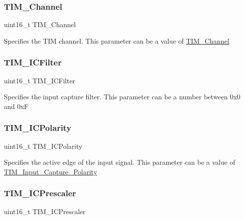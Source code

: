 \subsubsection{\texorpdfstring{TIM\_Channel}{TIM\_Channel}}
{\footnotesize\ttfamily uint16\+\_\+t T\+I\+M\+\_\+\+Channel}

Specifies the T\+IM channel. This parameter can be a value of \mbox{\hyperlink{group___t_i_m___channel}{T\+I\+M\+\_\+\+Channel}} \mbox{\label{struct_t_i_m___i_c_init_type_def_a751574b5d1f66bea6c3405d2975e420a}} 
\subsubsection{\texorpdfstring{TIM\_ICFilter}{TIM\_ICFilter}}
{\footnotesize\ttfamily uint16\+\_\+t T\+I\+M\+\_\+\+I\+C\+Filter}

Specifies the input capture filter. This parameter can be a number between 0x0 and 0xF \mbox{\label{struct_t_i_m___i_c_init_type_def_a71dc0cc2f4eb59451ea323719b0741bb}} 
\subsubsection{\texorpdfstring{TIM\_ICPolarity}{TIM\_ICPolarity}}
{\footnotesize\ttfamily uint16\+\_\+t T\+I\+M\+\_\+\+I\+C\+Polarity}

Specifies the active edge of the input signal. This parameter can be a value of \mbox{\hyperlink{group___t_i_m___input___capture___polarity}{T\+I\+M\+\_\+\+Input\+\_\+\+Capture\+\_\+\+Polarity}} \mbox{\label{struct_t_i_m___i_c_init_type_def_abdff50beb0809a640ccf2cebde439a00}} 
\subsubsection{\texorpdfstring{TIM\_ICPrescaler}{TIM\_ICPrescaler}}
{\footnotesize\ttfamily uint16\+\_\+t T\+I\+M\+\_\+\+I\+C\+Prescaler}

